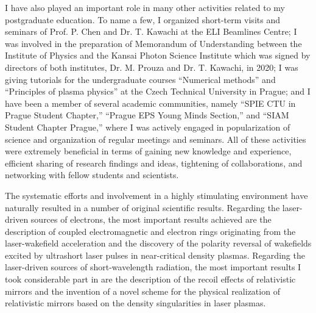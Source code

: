 \documentclass[10pt, a4paper, twoside, openright]{report}
\newcommand{\q}[1]{``#1''} %
\begin{document}
I have also played an important role in many other activities related to my postgraduate education. To name a few, I organized short-term visits and seminars of Prof. P. Chen and Dr. T. Kawachi at the ELI Beamlines Centre; I was involved in the preparation of Memorandum of Understanding between the Institute of Physics and the Kansai Photon Science Institute which was signed by directors of both institutes, Dr. M. Prouza and Dr. T. Kawachi, in 2020; I was giving tutorials for the undergraduate courses \q{Numerical methods} and \q{Principles of plasma physics} at the Czech Technical University in Prague; and I have been a member of several academic communities, namely \q{SPIE CTU in Prague Student Chapter,} \q{Prague EPS Young Minds Section,} and \q{SIAM Student Chapter Prague,} where I was actively engaged in popularization of science and organization of regular meetings and seminars. All of these activities were extremely beneficial in terms of gaining new knowledge and experience, efficient sharing of research findings and ideas, tightening of collaborations, and networking with fellow students and scientists.

The systematic efforts and involvement in a highly stimulating environment have naturally resulted in a number of original scientific results. Regarding the laser-driven sources of electrons, the most important results achieved are the description of coupled electromagnetic and electron rings originating from the laser-wakefield acceleration and the discovery of the polarity reversal of wakefields excited by ultrashort laser pulses in near-critical density plasmas. Regarding the laser-driven sources of short-wavelength radiation, the most important results I took considerable part in are the description of the recoil effects of relativistic mirrors and the invention of a novel scheme for the physical realization of relativistic mirrors based on the density singularities in laser plasmas. 
\end{document}

